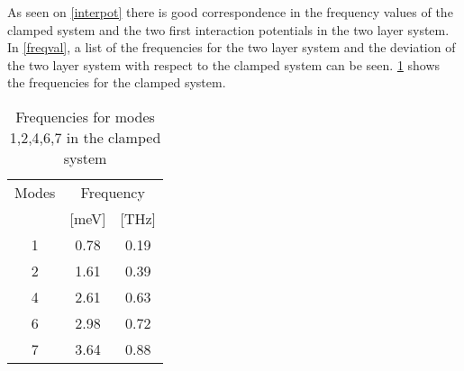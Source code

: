 As seen on \cref{interpot} there is good correspondence in the frequency values of the clamped system and the two first interaction potentials in the two layer system. In \cref{freqval}, a list of the frequencies for the two layer system and the deviation of the two layer system with respect to the clamped system can be seen. \cref{freqclamp} shows the frequencies for the clamped system.
\begin{table}
  \centering
  \begin{tabular}{c|cc}
    \toprule
     Modes &     \multicolumn{2}{c}{Frequency}\\
           &   [\si{\meV}] & [THz] \\
    \hline \hline
           1 &        0.78 & 0.19 \\
           2 &        1.61 & 0.39 \\
           4 &        2.61 & 0.63 \\
           6 &        2.98 & 0.72 \\
           7 &        3.64 & 0.88 \\
    \bottomrule
  \end{tabular}
  \caption{Frequencies for modes 1,2,4,6,7 in the clamped system}
  \label{freqclamp}
\end{table}
